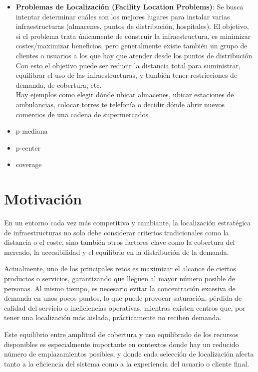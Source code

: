 \documentclass[12pt,a4paper]{book}
\begin{document}
\begin{itemize}
    \item \textbf{Problemas de Localización (Facility Location Problems)}: Se busca intentar determinar cuáles son los mejores lugares para instalar varias infraestructuras (almacenes, puntos de distribución, hospitales). El objetivo, si el problema trata únicamente de construir la infraestructura, es minimizar costes/maximizar beneficios, pero generalmente existe también un grupo de clientes o usuarios a los que hay que atender desde los puntos de distribución Con esto el objetivo puede ser reducir la distancia total para suministrar, equilibrar
el uso de las infraestructuras, y también tener restricciones de demanda, de cobertura, etc.\\
Hay ejemplos como elegir dónde ubicar almacenes, ubicar estaciones de ambulancias, colocar torres te telefonía o decidir dónde abrir nuevos comercios de una cadena de supermercados.
    \item p-mediana
    \item p-center
    \item coverage
\end{itemize}

\section{Motivación}
En un entorno cada vez más competitivo y cambiante, la localización estratégica de infraestructuras no solo debe considerar criterios tradicionales como la distancia o el coste, sino también otros factores clave como la cobertura del mercado, la accesibilidad y el equilibrio en la distribución de la demanda.

Actualmente, uno de los principales retos es maximizar el alcance de ciertos productos o servicios, garantizando que lleguen al mayor número posible de personas. Al mismo tiempo, es necesario evitar la concentración excesiva de demanda en unos pocos puntos, lo que puede provocar saturación, pérdida de calidad del servicio o ineficiencias operativas, mientras existen centros que, por tener una localización más aislada, prácticamente no reciben demanda.

Este equilibrio entre amplitud de cobertura y uso equilibrado de los recursos disponibles es especialmente importante en contextos donde hay un reducido número de emplazamientos posibles, y donde cada selección de localización afecta tanto a la eficiencia del sistema como a la experiencia del usuario o cliente final.
\end{document}
